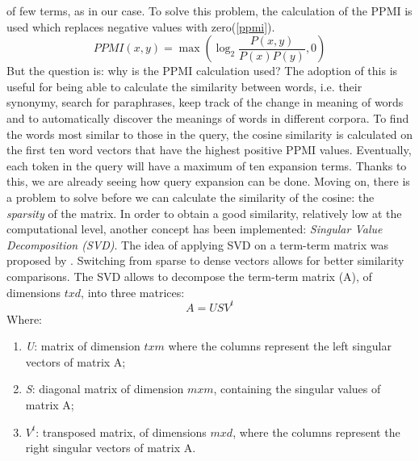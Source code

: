 of few terms, as in our case. To solve this problem, the calculation of the 
PPMI is used which replaces negative values with zero(\ref{ppmi}).
\begin{equation}\label{ppmi}
    PPMI(x,y) = \max(\log_2\frac{P(x,y)}{P(x)P(y)}, 0)
\end{equation}
But the question is: why is the PPMI calculation used? The adoption of 
this is useful for being able to calculate the similarity between words, i.e. 
their synonymy, search for paraphrases, keep track of the change in meaning 
of words and to automatically discover the meanings of words in different 
corpora. To find the words most similar to those in the query, the cosine 
similarity is calculated on the first ten word vectors that have the highest 
positive PPMI values. Eventually, each token in the query will have a maximum 
of ten expansion terms. Thanks to this, we are already seeing how 
query expansion can be done. Moving on, there is a problem to solve before we can 
calculate the similarity of the cosine: the \emph{sparsity} of the matrix. In order to 
obtain a good similarity, relatively low at the computational level, another 
concept has been implemented: \emph{Singular Value Decomposition (SVD)}. The 
idea of applying SVD on a term-term matrix was proposed by \cite{13}. Switching 
from sparse to dense vectors allows for better similarity comparisons. The 
SVD allows to decompose the term-term matrix (A), of dimensions $txd$, into 
three matrices:
\begin{equation}
    A = USV^t
\end{equation}
Where:
\begin{enumerate}
    \item \emph{U}: matrix of dimension $txm$ where the columns represent the left 
    singular vectors of matrix A;
    \item \emph{S}: diagonal matrix of dimension $mxm$, containing the singular values 
    of matrix A;
    \item \emph{$V^t$}: transposed matrix, of dimensions $mxd$, where the columns represent 
    the right singular vectors of matrix A.
\end{enumerate}